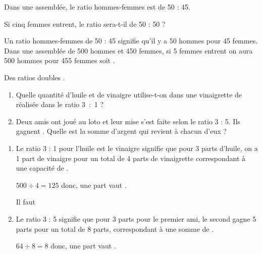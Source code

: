 \begin{Maquette}[Fiche,CorrigeFin,Colonnes=2]{}
\begin{multicols}{2}
      \begin{exercice} %
         Dans une assemblée, le ratio hommes-femmes est de 50 : 45. \par
         Si cinq femmes entrent, le ratio sera-t-il de 50 : 50 ?
      \end{exercice}
      
      \begin{Solution}
         Un ratio hommes-femmes de 50 : 45 signifie qu'il y a 50 hommes pour 45 femmes. Dans une assemblée de 500 hommes et 450 femmes, si 5 femmes entrent on aura 500 hommes pour 455 femmes soit .
      \end{Solution}


      \begin{exercice} %
         Des ratios \og doubles \fg.
            \begin{enumerate}
               \item Quelle quantité d'huile et de vinaigre utilise-t-on dans une vinaigrette de  réalisée dans le ratio 3~:~1 ?
               \item Deux amis ont joué au loto et leur mise s'est faite selon le ratio 3 : 5. Ils gagnent . Quelle est la somme d'argent qui revient à chacun d'eux ?
         \end{enumerate}
      \end{exercice}
      
      \begin{Solution}
         \begin{enumerate}
            \item Le ratio 3 : 1 pour l'huile est le vinaigre signifie que pour 3 parts d'huile, on a 1 part de vinaigre pour un total de 4 parts de vinaigrette correspondant à une capacité de . \par
               \qquad {} \par
               $500\div4 =125$ donc, une part vaut . \par
               Il faut         
            \item Le ratio 3 : 5 signifie que pour 3 parts pour le premier ami, le second gagne 5 parts pour un total de 8 parts, correspondant à une somme de . \par
               $64\div8 =8$ donc, une part vaut . \par
         \end{enumerate}
      \end{Solution}
      


\end{multicols}
\end{Maquette}
